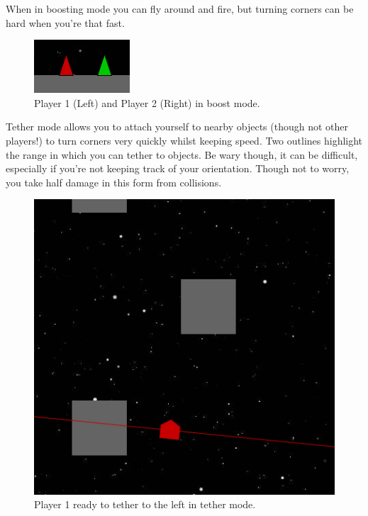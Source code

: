\documentclass[10pt,a4paper]{article}
\begin{document}
When in boosting mode you can fly around and fire, but turning corners can be hard when you're that fast.

\begin{figure}[!h]
\centering
  \includegraphics{boost_mode.png}
  \caption{Player 1 (Left) and Player 2 (Right) in boost mode.}
  \label{fig:boat1}
\end{figure}

Tether mode allows you to attach yourself to nearby objects (though not other players!) to turn corners very quickly whilst keeping speed. Two outlines highlight the range in which you can tether to objects. Be wary though, it can be difficult, especially if you're not keeping track of your orientation. Though not to worry, you take half damage in this form from collisions.

\begin{figure}[!h]
\centering
  \includegraphics[width=\linewidth]{player_1_ready_tether.png}
  \caption{Player 1 ready to tether to the left in tether mode.}
  \label{fig:boat1}
\end{figure}
\end{document}
